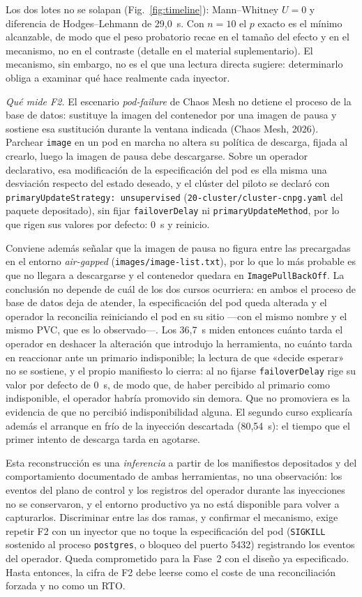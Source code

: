 \documentclass[12pt,twocolumn,letterpaper]{article}
\begin{document}
Los dos lotes no se solapan (Fig.~\ref{fig:timeline}): Mann--Whitney $U=0$ y diferencia de Hodges--Lehmann de 29,0~s. Con $n=10$ el $p$ exacto es el mínimo alcanzable, de modo que el peso probatorio recae en el tamaño del efecto y en el mecanismo, no en el contraste (detalle en el material suplementario). El mecanismo, sin embargo, no es el que una lectura directa sugiere: determinarlo obliga a examinar qué hace realmente cada inyector.

\textit{Qué mide F2.} El escenario \textit{pod-failure} de Chaos Mesh no detiene el proceso de la base de datos: sustituye la imagen del contenedor por una imagen de pausa y sostiene esa sustitución durante la ventana indicada (Chaos Mesh, 2026). Parchear \texttt{image} en un pod en marcha no altera su política de descarga, fijada al crearlo, luego la imagen de pausa debe descargarse. Sobre un operador declarativo, esa modificación de la especificación del pod es ella misma una desviación respecto del estado deseado, y el clúster del piloto se declaró con \texttt{primaryUpdateStrategy:\ unsupervised} (\texttt{20-cluster/\allowbreak cluster-cnpg.yaml} del paquete depositado), sin fijar \texttt{failoverDelay} ni \texttt{primaryUpdateMethod}, por lo que rigen sus valores por defecto: 0~s y reinicio.

Conviene además señalar que la imagen de pausa no figura entre las precargadas en el entorno \textit{air-gapped} (\texttt{images/image-list.txt}), por lo que lo más probable es que no llegara a descargarse y el contenedor quedara en \texttt{ImagePullBackOff}. La conclusión no depende de cuál de los dos cursos ocurriera: en ambos el proceso de base de datos deja de atender, la especificación del pod queda alterada y el operador la reconcilia reiniciando el pod en su sitio —con el mismo nombre y el mismo PVC, que es lo observado—. Los 36,7~s miden entonces cuánto tarda el operador en deshacer la alteración que introdujo la herramienta, no cuánto tarda en reaccionar ante un primario indisponible; la lectura de que «decide esperar» no se sostiene, y el propio manifiesto lo cierra: al no fijarse \texttt{failoverDelay} rige su valor por defecto de 0~s, de modo que, de haber percibido al primario como indisponible, el operador habría promovido sin demora. Que no promoviera es la evidencia de que no percibió indisponibilidad alguna. El segundo curso explicaría además el arranque en frío de la inyección descartada (80,54~s): el tiempo que el primer intento de descarga tarda en agotarse.

Esta reconstrucción es una \emph{inferencia} a partir de los manifiestos depositados y del comportamiento documentado de ambas herramientas, no una observación: los eventos del plano de control y los registros del operador durante las inyecciones no se conservaron, y el entorno productivo ya no está disponible para volver a capturarlos. Discriminar entre las dos ramas, y confirmar el mecanismo, exige repetir F2 con un inyector que no toque la especificación del pod  (\texttt{SIGKILL} sostenido al proceso \texttt{postgres}, o bloqueo del puerto 5432) registrando los eventos del operador. Queda comprometido para la Fase~2 con el diseño ya especificado. Hasta entonces, la cifra de F2 debe leerse como el coste de una reconciliación forzada y no como un RTO.
\end{document}

